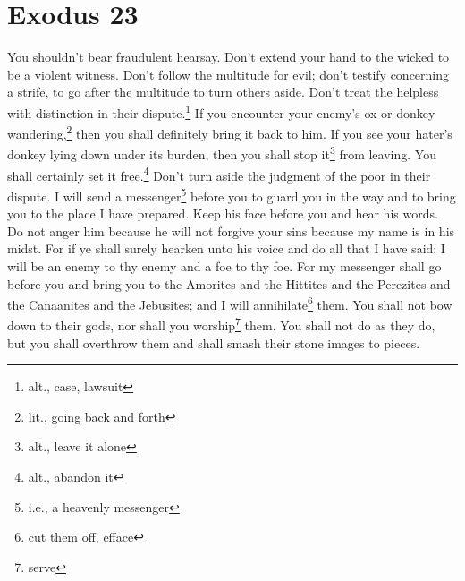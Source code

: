 \section{Exodus 23}\label{Exodus 23}
\begin{enumerate}[align=center]
     You shouldn't bear fraudulent hearsay. Don't extend your hand to the wicked to be a violent witness.%
     Don't follow the multitude for evil; don't testify concerning a strife, to go after the multitude to turn others aside.%
     Don't treat the helpless with distinction in their dispute.\footnote{alt., case, lawsuit}%
     If you encounter your enemy's ox or donkey wandering,\footnote{lit., going back and forth} then you shall definitely bring it back to him.%
     If you see your hater's donkey lying down under its burden, then you shall stop it\footnote{alt., leave it alone} from leaving. You shall certainly set it free.\footnote{alt., abandon it}%
     Don't turn aside the judgment of the poor in their dispute.%
     I will send a messenger\footnote{i.e., a heavenly messenger} before you to guard you in the way and to bring you to the place I have prepared.%
     Keep his face before you and hear his words. Do not anger him because he will not forgive your sins because my name is in his midst.%
     For if ye shall surely hearken unto his voice and do all that I have said: I will be an enemy to thy enemy and a foe to thy foe.%
     For my messenger shall go before you and bring you to the Amorites and the Hittites and the Perezites and the Canaanites and the Jebusites; and I will annihilate\footnote{cut them off, efface} them.%
     You shall not bow down to their gods, nor shall you worship\footnote{serve} them. You shall not do as they do, but you shall overthrow them and shall smash their stone images to pieces.%

\end{enumerate}
